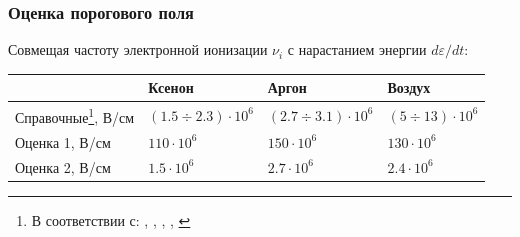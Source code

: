 \documentclass{beamer}
\begin{document}
	\begin{frame}
		\frametitle{Оценка порогового поля}
		
		Совмещая частоту электронной ионизации $\nu_i$ с нарастанием энергии $d\varepsilon/dt$:
		\begin{center}
		\end{center}
		
		\footnotesize
		\begin{table}[]
			\begin{tabular}{llll}
				\hline
				& Ксенон            & Аргон            & Воздух              \\ \hline
				Справочные\footnote{В соответствии с: \cite{raizer}, \cite{argon_threshold}, \cite{xenon_threshold}, \cite{air_breakdown}, \cite{air_threshold}}, В/см & $(1.5 \div 2.3) \cdot 10^6$ & $(2.7 \div 3.1) \cdot 10^6$ & $(5 \div 13) \cdot 10^6$ \\
				Оценка 1, В/см & $110 \cdot 10^6$ & $150 \cdot 10^6$ & $130 \cdot 10^6$ \\
				Оценка 2, В/см & $1.5 \cdot 10^6$ & $2.7 \cdot 10^6$ & $2.4 \cdot 10^6$ \\ \hline
			\end{tabular}
		\end{table}
				



\end{frame}
\end{document}
